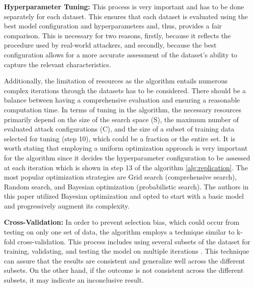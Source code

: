 \documentclass[sigconf]{acmart}
\begin{document}
\vspace{4mm}




\textbf{Hyperparameter Tuning:} This process is very important and has to be done separately for each dataset. This ensures that each dataset is evaluated using the best model configuration and hyperparameters and, thus, provides a fair comparison. This is necessary for two reasons, firstly, because it reflects the procedure used by real-world attackers, and secondly, because the best configuration allows for a more accurate assessment of the dataset's ability to capture the relevant characteristics.

Additionally, the limitation of resources as the algorithm entails numerous complex iterations through the datasets has to be considered. There should be a balance between having a comprehensive evaluation and ensuring a reasonable computation time. In terms of tuning in the algorithm, the necessary resources primarily depend on the size of the search space (S), the maximum number of evaluated attack configurations (C), and the size of a subset of training data selected for tuning (step 10), which could be a fraction or the entire set. It is worth stating that employing a uniform optimization approach is very important for the algorithm since it decides the hyperparameter configuration to be assessed at each iteration which is shown in step 13 of the algorithm \ref{alg:replication}. The most popular optimization strategies are Grid search (comprehensive search), Random search, and Bayesian optimization (probabilistic search). The authors in this paper utilized Bayesian optimization and opted to start with a basic model and progressively augment its complexity. 

\vspace{3mm}

\textbf{Cross-Validation:} In order to prevent selection bias, which could occur from testing on only one set of data, the algorithm employs a technique similar to k-fold cross-validation. This process includes using several subsets of the dataset for training, validating, and testing the model on multiple iterations \cite{GeneralizationError}. This technique can assure that the results are consistent and generalize well across the different subsets. On the other hand, if the outcome is not consistent across the different subsets, it may indicate an inconclusive result.

\vspace{3mm}
\end{document}
